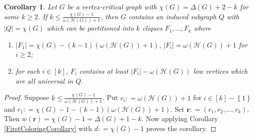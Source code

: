 \documentclass[12pt]{amsart}
\theoremstyle{plain}
\newtheorem{cor}[thm]{Corollary}
\theoremstyle{definition}
\theoremstyle{remark}
\newcommand{\fancy}[1]{\mathcal{#1}}
\newcommand{\set}[1]{\left\{ #1 \right\}}
\newcommand{\card}[1]{\left|#1\right|}
\newcommand{\irange}[1]{\left[#1\right]}
\newcommand{\parens}[1]{\left( #1 \right)}
\newcommand{\DefinedAs}{\mathrel{\mathop:}=}
\newcommand{\wt}[1]{w\parens{#1}}
\renewcommand{\vec}[1]{\mathbf{#1}}
\begin{document}
	\begin{cor}\label{SecondColoring}
	Let $G$ be a vertex-critical graph with $\chi(G) = \Delta(G) + 2 - k$ for some
	$k \geq 2$.  If $k \leq \frac{\chi(G) - 1}{\omega(\fancy{H}(G)) + 1}$,
	then $G$ contains an induced subgraph $Q$ with $\card{Q} = \chi(G)$ which can be partitioned into $k$ cliques $F_1, \ldots, F_k$ where 
					\begin{enumerate}
					\item $\card{F_1} = \chi(G) - (k-1)(\omega(\fancy{H}(G)) + 1)$, $\card{F_i} = \omega(\fancy{H}(G)) + 1$ for $i \geq 2$;
					\item for each $i \in \irange{k}$, $F_i$ contains at least $\card{F_i} - \omega(\fancy{H}(G))$ low vertices which are all universal in $Q$.
					\end{enumerate}
	\end{cor}
	\begin{proof}
		Suppose $k \leq \frac{\chi(G) - 1}{\omega(\fancy{H}(G)) + 1}$.  Put
		$r_i \DefinedAs \omega(\fancy{H}(G)) + 1$ for $i \in \irange{k} - \set{1}$ and $r_1
		\DefinedAs \chi(G) - 1 - (k-1)(\omega(\fancy{H}(G)) + 1)$.  Set $\vec{r}
		\DefinedAs \parens{r_1, r_2, \ldots, r_k}$.  Then $\wt{\vec{r}} = \chi(G) - 1
		= \Delta(G) + 1 - k$.  Now applying Corollary \ref{FirstColoringCorollary}
		with $d \DefinedAs \chi(G) - 1$ proves the corollary.
	\end{proof}
	
\end{document}
